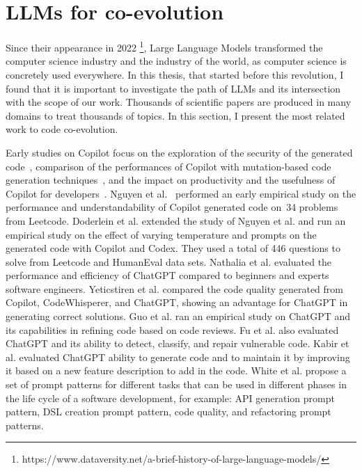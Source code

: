   \section{LLMs for co-evolution }
  \label{llmsforcoevolution}
  Since their appearance in 2022 \footnote{https://www.dataversity.net/a-brief-history-of-large-language-models/}, Large Language Models transformed the computer science industry and the industry of the world, as computer science is concretely used everywhere. In this thesis, that started before this revolution, I found that it is important to investigate the path of LLMs and its intersection with the scope of our work. Thousands of scientific papers are produced in many domains to treat thousands of topics. In this section, I present the most related work to code co-evolution.
  
  Early studies on Copilot focus on the exploration of the security of the generated code~\cite{pearce2022asleep}, comparison of the performances of Copilot with mutation-based code generation techniques~\cite{sobania2022choose}, and  the impact on productivity and the usefulness of Copilot for developers~\cite{ziegler2022productivity,vaithilingam2022expectation}.
  Nguyen et al.~\cite{nguyen2022empirical} performed an early empirical study on the performance and understandability of Copilot generated code on~34 problems from Leetcode. 
  Doderlein et al. \cite{doderlein2022piloting} extended the study of Nguyen et al. \cite{nguyen2022empirical} and run an empirical study on the effect of varying temperature and prompts on the generated code with Copilot and Codex. They used a total of 446 questions to solve from Leetcode and HumanEval data sets.  
  Nathalia et al. \cite{nathalia2023artificial} evaluated the performance and efficiency of ChatGPT compared to beginners and experts software engineers. 
  Yeticstiren et al. \cite{yeticstiren2023evaluating} compared the code quality generated from Copilot, CodeWhisperer, and ChatGPT, showing an advantage for ChatGPT in generating correct solutions. 
  Guo et al. \cite{guo2023exploring} ran an empirical study on ChatGPT and its capabilities in refining code based on code reviews. 
  Fu et al. \cite{fu2023chatgpt} also evaluated ChatGPT and its ability to detect, classify, and repair vulnerable code. 
  Kabir et al. \cite{kabir2023empirical} evaluated ChatGPT ability to generate code and to maintain it by improving it based on a new feature description to add in the code.  
 White et al. \cite{White2024} propose a set of prompt patterns for different tasks that can be used in different phases in the life cycle of a software development, for example: API generation prompt pattern, DSL creation prompt pattern, code quality, and refactoring prompt patterns.
  
